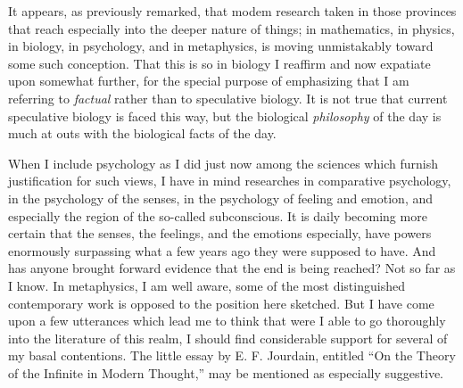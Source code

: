 \documentclass[a4paper, 11pt, oneside, polutonikogreek, english, landscape]{article}
\begin{document}
It appears, as previously remarked, that modem research taken in those provinces that reach especially into the deeper nature of things; in mathematics, in physics, in biology, in psychology, and in metaphysics, is moving unmistakably toward some such conception. That this is so in biology I reaffirm and now expatiate upon somewhat further, for the special purpose of emphasizing that I am referring to \emph{factual} rather than to speculative biology. It is not true that current speculative biology is faced this way, but the biological \emph{philosophy} of the day is much at outs with the biological facts of the day.

When I include psychology as I did just now among the sciences which furnish justification for such views, I have in mind researches in comparative psychology, in the psychology of the senses, in the psychology of feeling and emotion, and especially the region of the so-called subconscious. It is daily becoming more certain that the senses, the feelings, and the emotions especially, have powers enormously surpassing what a few years ago they were supposed to have. And has anyone brought forward evidence that the end is being reached? Not so far as I know. In metaphysics, I am well aware, some of the most distinguished contemporary work is opposed to the position here sketched. But I have come upon a few utterances which lead me to think that were I able to go thoroughly into the literature of this realm, I should find considerable support for several of my basal contentions. The little essay by E. F. Jourdain, entitled ``On the Theory of the Infinite in Modern Thought,'' may be mentioned as especially suggestive.

\subsection{}
\end{document}
